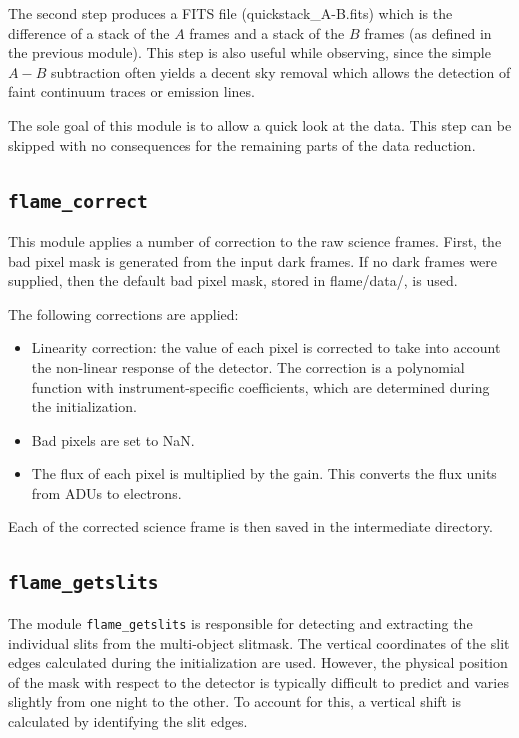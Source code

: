 \documentclass[a4paper, notitlepage]{article}
\begin{document}
The second step produces a FITS file (quickstack\_A-B.fits) which is the difference of a stack of the $A$ frames and a stack of the $B$ frames (as defined in the previous module). This step is also useful while observing, since the simple $A-B$ subtraction often yields a decent sky removal which allows the detection of faint continuum traces or emission lines.

The sole goal of this module is to allow a quick look at the data. This step can be skipped with no consequences for the remaining parts of the data reduction.



\subsection{\texttt{flame\_correct}}

This module applies a number of correction to the raw science frames. First, the bad pixel mask is generated from the input dark frames. If no dark frames were supplied, then the default bad pixel mask, stored in flame/data/, is used.

The following corrections are applied:
\begin{itemize}
\item Linearity correction: the value of each pixel is corrected to take into account the non-linear response of the detector. The correction is a polynomial function with instrument-specific coefficients, which are determined during the initialization.
\item Bad pixels are set to NaN.
\item The flux of each pixel is multiplied by the gain. This converts the flux units from ADUs to electrons.
\end{itemize}

Each of the corrected science frame is then saved in the intermediate directory.


\subsection{\texttt{flame\_getslits}}
\label{sec:getslits}

The module \texttt{flame\_getslits} is responsible for detecting and extracting the individual slits from the multi-object slitmask. The vertical coordinates of the slit edges calculated during the initialization are used. However, the physical position of the mask with respect to the detector is typically difficult to predict and varies slightly from one night to the other. To account for this, a vertical shift is calculated by identifying the slit edges.
\end{document}
